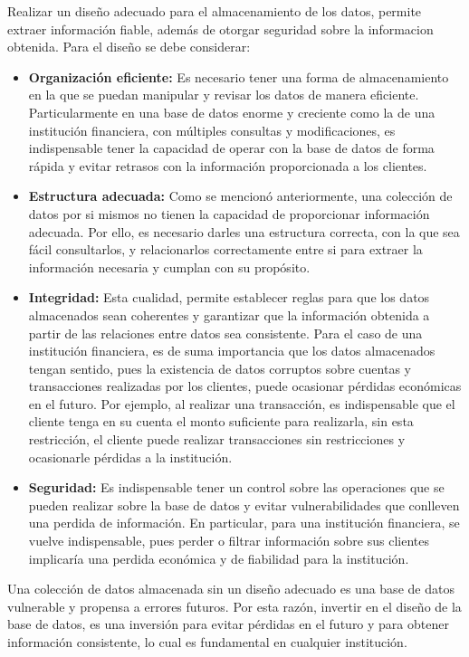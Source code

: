 Realizar un diseño adecuado para el almacenamiento de los datos, permite extraer información fiable, además de otorgar seguridad sobre la informacion obtenida. Para el diseño se debe considerar:
\begin{itemize}
    \item \textbf{Organización eficiente: } Es necesario tener una forma de almacenamiento en la que se puedan manipular y revisar los datos de manera eficiente. Particularmente en una base de datos enorme y creciente como la de una institución financiera, con múltiples consultas y modificaciones, es indispensable tener la capacidad de operar con la base de datos de forma rápida y evitar retrasos con la información proporcionada a los clientes.
    \item \textbf{Estructura adecuada: } Como se mencionó anteriormente, una colección de datos por si mismos no tienen la capacidad de proporcionar información adecuada. Por ello, es necesario darles una estructura correcta, con la que sea fácil consultarlos, y relacionarlos correctamente entre si para extraer la información necesaria y cumplan con su propósito.
    \item \textbf{Integridad: } Esta cualidad, permite establecer reglas para que los datos almacenados sean coherentes y garantizar que la información obtenida a partir de las relaciones entre datos sea consistente. Para el caso de una institución financiera, es de suma importancia que los datos almacenados tengan sentido, pues la existencia de datos corruptos sobre cuentas y transacciones realizadas por los clientes, puede ocasionar pérdidas económicas en el futuro. Por ejemplo, al realizar una transacción, es indispensable que el cliente tenga en su cuenta el monto suficiente para realizarla, sin esta restricción, el cliente puede realizar transacciones sin restricciones y ocasionarle pérdidas a la institución.
    \item \textbf{Seguridad: } Es indispensable tener un control sobre las operaciones que se pueden realizar sobre la base de datos y evitar vulnerabilidades que conlleven una perdida de información. En particular, para una institución financiera, se vuelve indispensable, pues perder o filtrar información sobre sus clientes implicaría una perdida económica y de fiabilidad para la institución.
\end{itemize}
Una colección de datos almacenada sin un diseño adecuado es una base de datos vulnerable y propensa a errores futuros. Por esta razón, invertir en el diseño de la base de datos, es una inversión para evitar pérdidas en el futuro y para obtener información consistente, lo cual es fundamental en cualquier institución.
